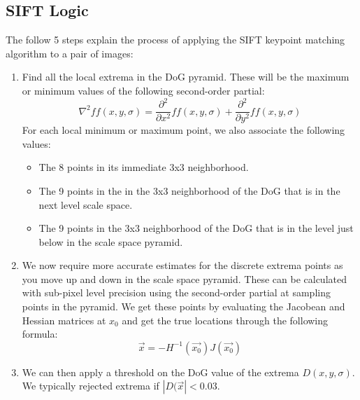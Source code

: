 \documentclass{article}
\begin{document}
\subsection{SIFT Logic}
The follow 5 steps explain the process of applying the SIFT keypoint matching algorithm to a pair of images:
\begin{enumerate}
    \item Find all the local extrema in the DoG pyramid. These will be the maximum or minimum values of the following second-order partial:
    \[\nabla ^2 ff(x, y, \sigma)=\frac{\partial^2}{\partial x^2}ff(x, y, \sigma) + \frac{\partial ^2}{\partial y^2}ff(x, y, \sigma)\]
    For each local minimum or maximum point, we also associate the following values:
    \begin{itemize}
        \item The 8 points in its immediate 3x3 neighborhood.
        \item The 9 points in the in the 3x3 neighborhood of the DoG that is in the next level scale space.
        \item The 9 points in the 3x3 neighborhood of the DoG that is in the level just below in the scale space pyramid.
    \end{itemize}
    \item We now require more accurate estimates for the discrete extrema points as you move up and down in the scale space pyramid. These can be calculated with sub-pixel level precision using the second-order partial at sampling points in the pyramid. We get these points by evaluating the Jacobean and Hessian matrices at $x_0$ and get the true locations through the following formula:
    \[\Vec{x} = -H^{-1}(\Vec{x_0}) J(\Vec{x_0})\]

    \item We can then apply a threshold on the DoG value of the extrema $D(x,y,\sigma)$. We typically rejected extrema if \(|D(\Vec{x}|<0.03\).


\end{enumerate}
\end{document}
